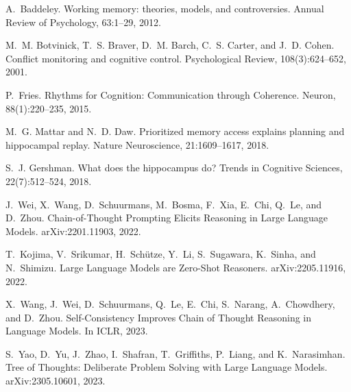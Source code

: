 \documentclass[11pt]{article}
\begin{document}
\begin{thebibliography}{99}
A.~Baddeley.
\newblock Working memory: theories, models, and controversies.
\newblock Annual Review of Psychology, 63:1--29, 2012.

M.~M. Botvinick, T.~S. Braver, D.~M. Barch, C.~S. Carter, and J.~D. Cohen.
\newblock Conflict monitoring and cognitive control.
\newblock Psychological Review, 108(3):624--652, 2001.

P.~Fries.
\newblock Rhythms for Cognition: Communication through Coherence.
\newblock Neuron, 88(1):220--235, 2015.

M.~G. Mattar and N.~D. Daw.
\newblock Prioritized memory access explains planning and hippocampal replay.
\newblock Nature Neuroscience, 21:1609--1617, 2018.

S.~J. Gershman.
\newblock What does the hippocampus do?
\newblock Trends in Cognitive Sciences, 22(7):512--524, 2018.

J.~Wei, X.~Wang, D.~Schuurmans, M.~Bosma, F.~Xia, E.~Chi, Q.~Le, and D.~Zhou.
\newblock Chain-of-Thought Prompting Elicits Reasoning in Large Language
  Models.
\newblock arXiv:2201.11903, 2022.

T.~Kojima, V.~Srikumar, H.~Sch{\"u}tze, Y.~Li, S.~Sugawara, K.~Sinha, and
  N.~Shimizu.
\newblock Large Language Models are Zero-Shot Reasoners.
\newblock arXiv:2205.11916, 2022.

X.~Wang, J.~Wei, D.~Schuurmans, Q.~Le, E.~Chi, S.~Narang, A.~Chowdhery, and
  D.~Zhou.
\newblock Self-Consistency Improves Chain of Thought Reasoning in Language
  Models.
\newblock In ICLR, 2023.

S.~Yao, D.~Yu, J.~Zhao, I.~Shafran, T.~Griffiths, P.~Liang, and K.~Narasimhan.
\newblock Tree of Thoughts: Deliberate Problem Solving with Large Language
  Models.
\newblock arXiv:2305.10601, 2023{}.


\end{thebibliography}
\end{document}
